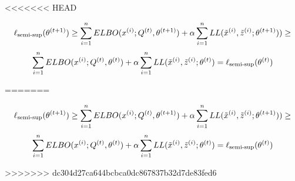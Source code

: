 <<<<<<< HEAD
\begin{answer}
$$\ell_\text{semi-sup}(\theta^{(t+1)}) \ge \sum_{i=1}^{{n}} ELBO(x^{(i)}; Q^{(t)}, \theta^{(t+1)}) + \alpha \sum_{i=1}^{{n}} LL(\tilde{x}^{(i)}, \tilde{z}^{(i)}; \theta^{(t+1)}))  \ge$$
$$\sum_{i=1}^{{n}} ELBO(x^{(i)}; Q^{(t)}, \theta^{(t)}) + \alpha \sum_{i=1}^{{n}} LL(\tilde{x}^{(i)}, \tilde{z}^{(i)}; \theta^{(t)}) = \ell_\text{semi-sup}(\theta^{(t)})$$
\end{answer}
=======
\begin{answer}
$$\ell_\text{semi-sup}(\theta^{(t+1)}) \ge \sum_{i=1}^{{n}} ELBO(x^{(i)}; Q^{(t)}, \theta^{(t+1)}) + \alpha \sum_{i=1}^{{n}} LL(\tilde{x}^{(i)}, \tilde{z}^{(i)}; \theta^{(t+1)}))  \ge$$
$$\sum_{i=1}^{{n}} ELBO(x^{(i)}; Q^{(t)}, \theta^{(t)}) + \alpha \sum_{i=1}^{{n}} LL(\tilde{x}^{(i)}, \tilde{z}^{(i)}; \theta^{(t)}) = \ell_\text{semi-sup}(\theta^{(t)})$$
\end{answer}
>>>>>>> dc304d27ca644bcbca0dc867837b32d7de83fed6
